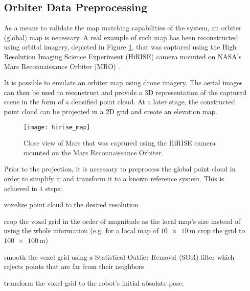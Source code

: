 \subsection{Orbiter Data Preprocessing}

As a means to validate the map matching capabilities of the system,
an orbiter (global) map is necessary.
A real example of such map has been reconstructed using orbital imagery,
depicted in Figure \ref{fig:hirise_map}, that was captured using the
High Resolution Imaging Science Experiment (HiRISE) camera mounted
on NASA's Mars Reconnaissance Orbiter (MRO) \parencite{Gallagher2005}.

It is possible to emulate an orbiter map using drone imagery.
The aerial images can then be used to reconstruct and provide a 3D
representation of the captured scene in the form of a densified point cloud.
At a later stage, the constructed point cloud can be projected in a 2D
grid and create an elevation map.

\begin{figure}[h!]
    \centering
    \texttt{[image: hirise\_map]}
    \decoRule
    \caption[Mars view from HiRISE]{
        Close view of Mars that was captured using the HiRISE camera
        mounted on the Mars Reconnaissance Orbiter.
    }
    \label{fig:hirise_map}
\end{figure}

Prior to the projection, it is necessary to preprocess the global point cloud
in order to simplify it and transform it to a known reference system.
This is achieved in 4 steps:
\begin{enumerate*}[label=(\roman*)]
    \item voxelize point cloud to the desired resolution
    \item crop the voxel grid in the order of magnitude as the local map's
        size instead of using the whole information
        (e.g. for a local map of $\SI{10 x 10}{\m}$ crop the grid to
        $\SI{100 x 100}{\m}$)
    \item smooth the voxel grid using a Statistical Outlier Removal (SOR)
        filter which rejects points that are far from their neighbors
    \item transform the voxel grid to the robot's initial absolute pose.
\end{enumerate*}

